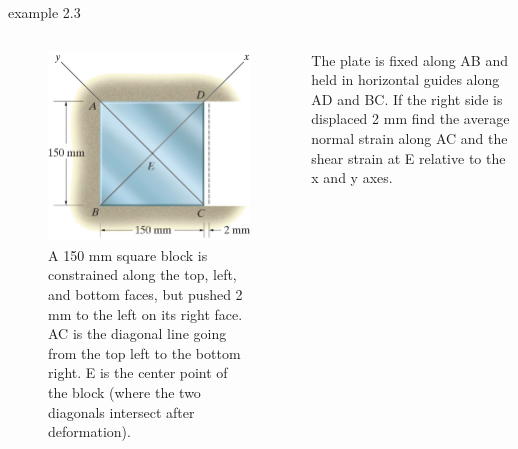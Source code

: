 \documentclass[
  letterpaper,
  ignorenonframetext,
  aspectratio=43,
  handout,
  12pt]{beamer}
\let\Oldincludegraphics\includegraphics
\renewcommand{\includegraphics}[2][]{\Oldincludegraphics[width=\textwidth,height=0.7\textheight,keepaspectratio]{#2}}
\begin{document}
\begin{frame}{example 2.3}
\protect\hypertarget{example-2.3}{}
\begin{columns}[T]
\begin{column}{0.5\textwidth}
\begin{figure}
\centering
\includegraphics{../images/example-2-3.jpg}
\caption{A 150 mm square block is constrained along the top, left, and
bottom faces, but pushed 2 mm to the left on its right face. AC is the
diagonal line going from the top left to the bottom right. E is the
center point of the block (where the two diagonals intersect after
deformation).}
\end{figure}
\end{column}

\begin{column}{0.5\textwidth}
The plate is fixed along AB and held in horizontal guides along AD and
BC. If the right side is displaced 2 mm find the average normal strain
along AC and the shear strain at E relative to the x and y axes.
\end{column}
\end{columns}
\end{frame}
\end{document}
